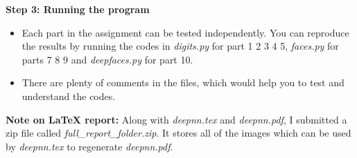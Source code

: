 \documentclass{article}
\begin{document}
\textbf{Step 3: Running the program}
\begin{itemize}
\item Each part in the assignment can be tested independently. You can reproduce the results by running the codes in \textit{digits.py} for part 1 2 3 4 5, \textit{faces.py} for parts 7 8 9 and \textit{deepfaces.py} for part 10. 
\item There are plenty of comments in the files, which would help you to test and understand the codes.
\end{itemize}
\textbf{Note on LaTeX report:} Along with \textit{deepnn.tex} and  \textit{deepnn.pdf}, I submitted a zip file called  \textit{full\_report\_folder.zip}. It stores all of the images which can be used by \textit{deepnn.tex} to regenerate \textit{deepnn.pdf}.
\clearpage



\end{document}
